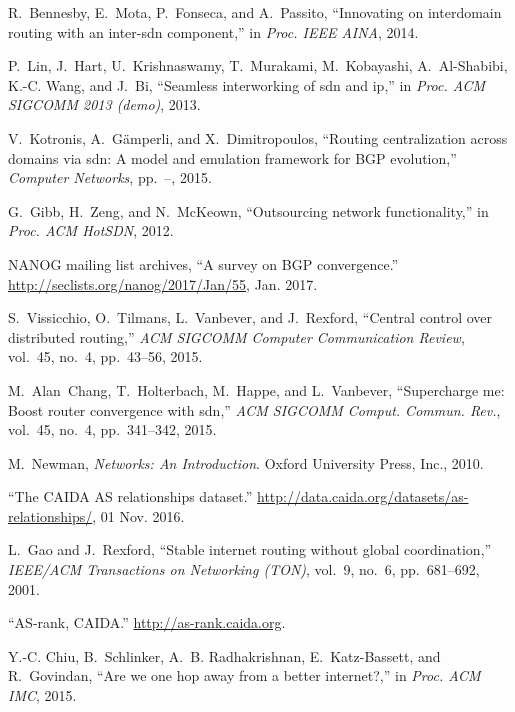\documentclass[10pt, conference, letterpaper]{IEEEtran}%
\begin{document}
\begin{thebibliography}{10}
R.~Bennesby, E.~Mota, P.~Fonseca, and A.~Passito, ``Innovating on interdomain
  routing with an inter-sdn component,'' in {\em Proc. IEEE AINA}, 2014.

P.~Lin, J.~Hart, U.~Krishnaswamy, T.~Murakami, M.~Kobayashi, A.~Al-Shabibi,
  K.-C. Wang, and J.~Bi, ``Seamless interworking of sdn and ip,'' in {\em Proc.
  ACM SIGCOMM 2013 (demo)}, 2013.

V.~Kotronis, A.~G{\"a}mperli, and X.~Dimitropoulos, ``Routing centralization
  across domains via sdn: A model and emulation framework for {BGP}
  evolution,'' {\em Computer Networks}, pp.~--, 2015.

G.~Gibb, H.~Zeng, and N.~McKeown, ``Outsourcing network functionality,'' in
  {\em Proc. ACM HotSDN}, 2012.

{{NANOG} mailing list archives}, ``{A survey on {BGP} convergence}.''
  \url{http://seclists.org/nanog/2017/Jan/55}, Jan. 2017.

S.~Vissicchio, O.~Tilmans, L.~Vanbever, and J.~Rexford, ``Central control over
  distributed routing,'' {\em ACM SIGCOMM Computer Communication Review},
  vol.~45, no.~4, pp.~43--56, 2015.

M.~Alan~Chang, T.~Holterbach, M.~Happe, and L.~Vanbever, ``Supercharge me:
  Boost router convergence with sdn,'' {\em ACM SIGCOMM Comput. Commun. Rev.},
  vol.~45, no.~4, pp.~341--342, 2015.

M.~Newman, {\em Networks: An Introduction}.
\newblock Oxford University Press, Inc., 2010.

``The {CAIDA} {AS} relationships dataset.''
  \url{http://data.caida.org/datasets/as-relationships/}, 01 Nov. 2016.

L.~Gao and J.~Rexford, ``Stable internet routing without global coordination,''
  {\em IEEE/ACM Transactions on Networking (TON)}, vol.~9, no.~6, pp.~681--692,
  2001.

``{AS}-rank, {CAIDA}.'' \url{http://as-rank.caida.org}.

Y.-C. Chiu, B.~Schlinker, A.~B. Radhakrishnan, E.~Katz-Bassett, and
  R.~Govindan, ``Are we one hop away from a better internet?,'' in {\em Proc.
  ACM IMC}, 2015.


\end{thebibliography}
\end{document}
